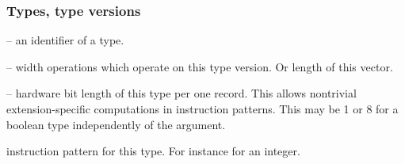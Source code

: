 \subsubsection{Types, type versions}
\begin{description}
        \item{} -- an identifier of a type.
        \item{} -- width operations which operate on this type version. Or length of this vector.
        \item{} -- hardware bit length of this type per one record. This allows nontrivial extension-specific computations in instruction patterns. This may be 1 or 8 for a boolean type independently of the  argument.
        \item{} instruction pattern for this type. For instance  for an integer.
\end{description}


